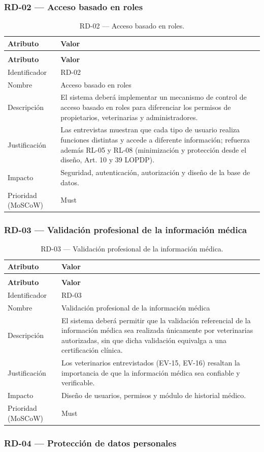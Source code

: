 \documentclass[journal,onecolumn]{IEEEtran}
\makeatletter
\newenvironment{atributos}[2]{%
	\small
	\begin{longtable}{@{}>{\raggedright\arraybackslash}p{4.2cm} >{\raggedright\arraybackslash}p{11.2cm}@{}}
		\caption{#2}\label{tab:#1}\\
		\toprule
		\textbf{Atributo} & \textbf{Valor} \\
		\midrule
		\endfirsthead
		\multicolumn{2}{@{}l}{\small\itshape (continuación)}\\
		\toprule
		\textbf{Atributo} & \textbf{Valor} \\
		\midrule
		\endhead
		\bottomrule
		\endlastfoot
	}{%
	\end{longtable}
	\normalsize
}
\makeatother
\begin{document}
	\subsubsection{RD-02 --- Acceso basado en roles}
	
	\begin{atributos}{RD-02}{RD-02 --- Acceso basado en roles.}
		Identificador & RD-02 \\
		Nombre & Acceso basado en roles \\
		Descripción & El sistema deberá implementar un mecanismo de control de acceso basado en roles para diferenciar los permisos de propietarios, veterinarias y administradores. \\
		Justificación & Las entrevistas muestran que cada tipo de usuario realiza funciones distintas y accede a diferente información; refuerza además RL-05 y RL-08 (minimización y protección desde el diseño, Art. 10 y 39 LOPDP). \\
		Impacto & Seguridad, autenticación, autorización y diseño de la base de datos. \\
		Prioridad (MoSCoW) & Must \\
	\end{atributos}
	
	\subsubsection{RD-03 --- Validación profesional de la información médica}
	
	\begin{atributos}{RD-03}{RD-03 --- Validación profesional de la información médica.}
		Identificador & RD-03 \\
		Nombre & Validación profesional de la información médica \\
		Descripción & El sistema deberá permitir que la validación referencial de la información médica sea realizada únicamente por veterinarias autorizadas, sin que dicha validación equivalga a una certificación clínica. \\
		Justificación & Los veterinarios entrevistados (EV-15, EV-16) resaltan la importancia de que la información médica sea confiable y verificable. \\
		Impacto & Diseño de usuarios, permisos y módulo de historial médico. \\
		Prioridad (MoSCoW) & Must \\
	\end{atributos}
	
	\subsubsection{RD-04 --- Protección de datos personales}
	
\end{document}
